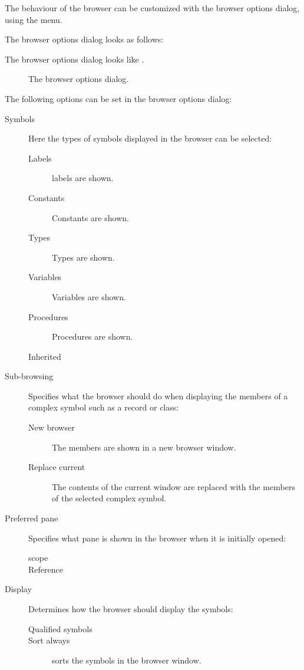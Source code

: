 The behaviour of the browser can be customized with the browser options
dialog, using the  menu.
\begin{htmlonly}
The browser options dialog looks as follows:
\end{htmlonly}
\begin{latexonly}
The browser options dialog looks like .
\begin{figure}[ht]
\caption{The browser options dialog.}\label{fig:obrowser}
\ifpdf
{}
\else
{}
\fi
\end{figure}
\end{latexonly}
The following options can be set in the browser options dialog:
\begin{description}
\item[Symbols] Here the types of symbols displayed in the browser can be
selected:
\begin{description}
\item[Labels] labels are shown.
\item[Constants] Constants are shown.
\item[Types] Types are shown.
\item[Variables] Variables are shown.
\item[Procedures] Procedures are shown.
\item[Inherited]
\end{description}
\item[Sub-browsing] Specifies what the browser should do when displaying the
members of a complex symbol such as a record or class:
\begin{description}
\item[New browser] The members are shown in a new browser window.
\item[Replace current] The contents of the current window are replaced with
the members of the selected complex symbol.
\end{description}
\item[Preferred pane] Specifies what pane is shown in the browser when it is
initially opened:
\begin{description}
\item[scope]
\item[Reference]
\end{description}
\item[Display] Determines how the browser should display the symbols:
\begin{description}
\item[Qualified symbols]
\item[Sort always] sorts the symbols in the browser window. 
\end{description}
\end{description}

